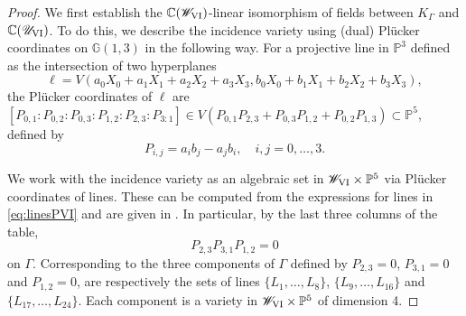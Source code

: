 \documentclass[a4paper,reqno]{amsart}
\numberwithin{equation}{section}
\newcommand{\C}{\mathbb{C}}
\newcommand{\p}{\mathbb{P}}
\numberwithin{equation}{section}
\begin{document}
\begin{proof}
    We first establish the $\C(\mathscr{W}_{\rm{VI}})$-linear isomorphism of fields between $K_{\Gamma}$ and $\C(\mathscr{U}_{\rm{VI}})$. 
    To do this, we describe the incidence variety using (dual) Pl\"ucker coordinates on $\mathbb{G}(1,3)$ in the following way.
For a projective line in $\p^3$ defined as the intersection of two hyperplanes
\begin{equation*}
    \ell = V( a_0 X_0+a_1X_1+a_2X_2+a_3X_3, b_0 X_0+b_1X_1+b_2X_2+b_3X_3),
\end{equation*}
the Pl\"ucker coordinates of $\ell$ are $[P_{0,1}:P_{0,2}:P_{0,3}:P_{1,2}:P_{2,3}:P_{3:1}]\in V(P_{0,1}P_{2,3}+ P_{0,3}P_{1,2}+P_{0,2}P_{1,3})\subset \p^5$, defined by 
\begin{equation*}
    P_{i,j}=a_i b_j - a_j b_i, \quad i,j=0,\dots,3.
\end{equation*}

We work with the incidence variety as an algebraic set in $\mathscr{W}_{\rm{VI}}\times \p^5$ via Pl\"ucker coordinates of lines.
These can be computed from the expressions for lines in \eqref{eq:linesPVI} and are given in .
In particular, by the last three columns of the table,
\begin{equation*}
    P_{2,3}P_{3,1}P_{1,2}=0
\end{equation*}
on $\Gamma$. Corresponding to the three components of $\Gamma$ defined by $P_{2,3}=0$, $P_{3,1}=0$ and $P_{1,2}=0$,
are respectively the sets of lines
 $\{L_1,\ldots, L_8\}$, $\{L_9,\ldots, L_{16}\}$ and $\{L_{17},\ldots, L_{24}\}$.
Each component is a variety in $\mathscr{W}_{\rm{VI}}\times \p^5$ of dimension 4.


\end{proof}
\end{document}
